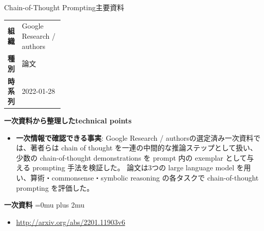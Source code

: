 \begin{technicalnote}{Chain-of-Thought Prompting}{主要資料}
\begingroup
\begin{tabularx}{\linewidth}{@{}>{\bfseries}p{0.22\linewidth}X@{}}
組織 & Google Research / authors \\
種別 & 論文 \\
時系列 & 2022-01-28 \\
\end{tabularx}
\smallskip
{\bfseries 一次資料から整理したtechnical points}
\begin{itemize}[leftmargin=1.5em,itemsep=0.35em]
\item \textbf{一次情報で確認できる事実}: Google Research / authorsの選定済み一次資料では、著者らは chain of thought を一連の中間的な推論ステップとして扱い、少数の chain-of-thought demonstrations を prompt 内の exemplar として与える prompting 手法を検証した。 論文は3つの large language model を用い、算術・commonsense・symbolic reasoning の各タスクで chain-of-thought prompting を評価した。
\end{itemize}
\begin{minipage}{\linewidth}
\begin{samepage}
{\bfseries 一次資料}
\begingroup\sloppy
\Urlmuskip=0mu plus 2mu\relax
\begin{itemize}[leftmargin=1.5em,itemsep=0.25em]
\item {\scriptsize\url{http://arxiv.org/abs/2201.11903v6}}
\end{itemize}
\endgroup
\end{samepage}
\end{minipage}
\endgroup
\end{technicalnote}
\medskip

